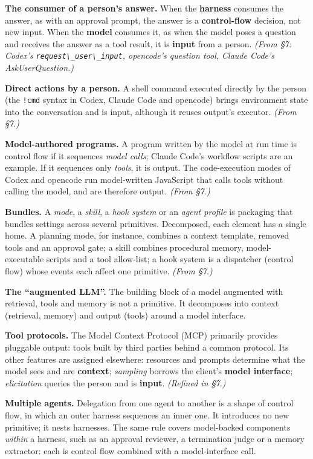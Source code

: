 \textbf{The consumer of a person's answer.} When the \textbf{harness} consumes the answer, as with an approval prompt, the answer is a \textbf{control-flow} decision, not new input. When the \textbf{model} consumes it, as when the model poses a question and receives the answer as a tool result, it is \textbf{input} from a person. \emph{(From §7: Codex's \passthrough{\lstinline!request\_user\_input!}, opencode's question tool, Claude Code's AskUserQuestion.)}

\textbf{Direct actions by a person.} A shell command executed directly by the person (the \passthrough{\lstinline"!cmd"} syntax in Codex, Claude Code and opencode) brings environment state into the conversation and is input, although it reuses output's executor. \emph{(From §7.)}

\textbf{Model-authored programs.} A program written by the model at run time is control flow if it sequences \emph{model calls}; Claude Code's workflow scripts are an example. If it sequences only \emph{tools}, it is output. The code-execution modes of Codex and opencode run model-written JavaScript that calls tools without calling the model, and are therefore output. \emph{(From §7.)}

\textbf{Bundles.} A \emph{mode}, a \emph{skill}, a \emph{hook system} or an \emph{agent profile} is packaging that bundles settings across several primitives. Decomposed, each element has a single home. A planning mode, for instance, combines a context template, removed tools and an approval gate; a skill combines procedural memory, model-executable scripts and a tool allow-list; a hook system is a dispatcher (control flow) whose events each affect one primitive. \emph{(From §7.)}

\textbf{The ``augmented LLM''.} The building block of a model augmented with retrieval, tools and memory \cite{schluntz2024building} is not a primitive. It decomposes into context (retrieval, memory) and output (tools) around a model interface.

\textbf{Tool protocols.} The Model Context Protocol (MCP) \cite{mcp} primarily provides pluggable output: tools built by third parties behind a common protocol. Its other features are assigned elsewhere: resources and prompts determine what the model sees and are \textbf{context}; \emph{sampling} borrows the client's \textbf{model interface}; \emph{elicitation} queries the person and is \textbf{input}. \emph{(Refined in §7.)}

\textbf{Multiple agents.} Delegation from one agent to another is a shape of control flow, in which an outer harness sequences an inner one. It introduces no new primitive; it nests harnesses. The same rule covers model-backed components \emph{within} a harness, such as an approval reviewer, a termination judge or a memory extractor: each is control flow combined with a model-interface call.


